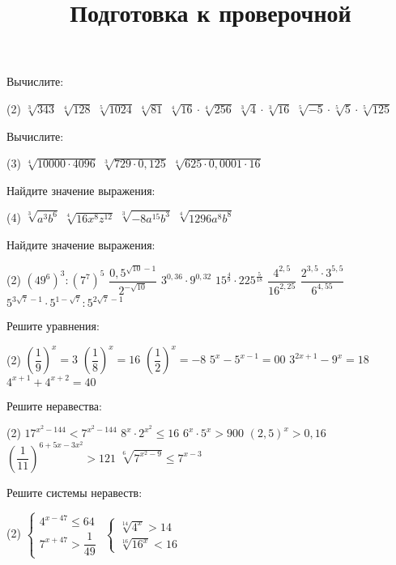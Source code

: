 \begin{class}[number=7]
	\title{Подготовка к проверочной}
	\begin{listofex}
		\item Вычислите:
		\begin{tasks}(2)
			\task \( \sqrt[3]{343} \)
			\task \( \sqrt[4]{128} \)
			\task \( \sqrt[5]{1024} \)
			\task \( \sqrt[4]{81} \)
			\task \( \sqrt[4]{16} \cdot \sqrt[4]{256} \)
			\task \( \sqrt[3]{4} \cdot \sqrt[3]{16} \)
			\task \( \sqrt[5]{-5} \cdot \sqrt[5]{5} \cdot \sqrt[5]{125} \)
		\end{tasks}
		\item Вычислите:
		\begin{tasks}(3)
			\task \( \sqrt[4]{10000 \cdot 4096} \)
			\task \( \sqrt[3]{729 \cdot 0,125} \)
			\task \( \sqrt[4]{625 \cdot 0,0001 \cdot 16} \)
		\end{tasks}
		\item Найдите значение выражения:
		\begin{tasks}(4)
			\task \( \sqrt[3]{a^3b^6} \)
			\task \( \sqrt[4]{16x^8z^{12}} \)
			\task \( \sqrt[3]{-8a^{15}b^3} \)
			\task \( \sqrt[4]{1296a^8b^8} \)
		\end{tasks}
		\item Найдите значение выражения:
		\begin{tasks}(2)
			\task \( (49^6)^3:(7^7)^5 \)
			\task \( \dfrac{0,5^{\sqrt{10}-1}}{2^{-\sqrt{10}}} \)
			\task \( 3^{0,36} \cdot 9^{0,32} \)
			\task \( 15^{\tfrac{4}{9}} \cdot 225^{\tfrac{5}{18}} \)
			\task \( \dfrac{4^{2,5}}{16^{2,25}} \)
			\task \( \dfrac{2^{3,5}\cdot3^{5,5}}{6^{4,55}} \)
			\task \( 5^{3\sqrt{7}-1}\cdot 5^{1-\sqrt{7}}:5^{2\sqrt{7}-1} \)
		\end{tasks}
		\item Решите уравнения:
		\begin{tasks}(2)
			\task \( \left( \dfrac{1}{9} \right)^x=3  \)
			\task \( \left( \dfrac{1}{8} \right)^x=16 \)
			\task \( \left( \dfrac{1}{2} \right)^x=-8 \)
			\task \( 5^{x}-5^{x-1}=00 \)
			\task \( 3^{2x+1}-9^x=18 \)
			\task \( 4^{x+1}+4^{x+2}=40 \)
		\end{tasks}
		\item Решите неравества:
		\begin{tasks}(2)
			\task \( 17^{x^2-144}<7^{x^2-144} \)
			\task \( 8^x \cdot 2^{x^2} \le 16 \)
			\task \( 6^x \cdot 5^x > 900 \)
			\task \( (2,5)^x > 0,16 \)
			\task \( \left( \dfrac{1}{11} \right)^{6+5x-3x^2} > 121 \)
			\task \( \sqrt[6]{7^{x^2-9}} \le 7^{x-3} \)
		\end{tasks}
		\item Решите системы неравеств:
		\begin{tasks}(2)
			\task \( \begin{cases} 4^{x-47} \le 64 \\ 7^{x+47} > \dfrac{1}{49} \end{cases} \)
			\task \( \begin{cases} \sqrt[14]{4^x}>14 \\ \sqrt[16]{16^x}<16 \end{cases} \)
		\end{tasks}
		

\end{listofex}
\end{class}
